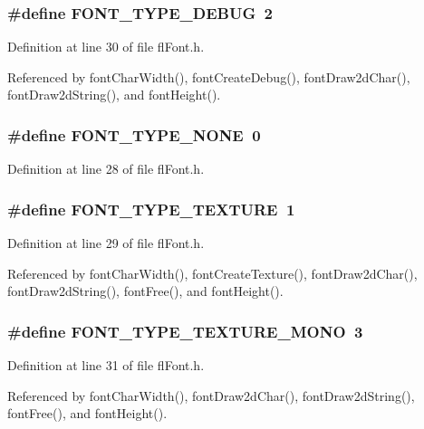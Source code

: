 \subsubsection{\setlength{\rightskip}{0pt plus 5cm}\#define FONT\_\-TYPE\_\-DEBUG~2}\label{flFont_8h_2bdce43e1cf054fb65e1cbab7be49064}




Definition at line 30 of file fl\-Font.h.

Referenced by font\-Char\-Width(), font\-Create\-Debug(), font\-Draw2d\-Char(), font\-Draw2d\-String(), and font\-Height().
\subsubsection{\setlength{\rightskip}{0pt plus 5cm}\#define FONT\_\-TYPE\_\-NONE~0}\label{flFont_8h_b52ace806e02861daff0a9f60874f318}




Definition at line 28 of file fl\-Font.h.
\subsubsection{\setlength{\rightskip}{0pt plus 5cm}\#define FONT\_\-TYPE\_\-TEXTURE~1}\label{flFont_8h_fad664fdb870e740aa0d9bc182298ea0}




Definition at line 29 of file fl\-Font.h.

Referenced by font\-Char\-Width(), font\-Create\-Texture(), font\-Draw2d\-Char(), font\-Draw2d\-String(), font\-Free(), and font\-Height().
\subsubsection{\setlength{\rightskip}{0pt plus 5cm}\#define FONT\_\-TYPE\_\-TEXTURE\_\-MONO~3}\label{flFont_8h_7dc8628be275d5fe722b01221ff470f9}




Definition at line 31 of file fl\-Font.h.

Referenced by font\-Char\-Width(), font\-Draw2d\-Char(), font\-Draw2d\-String(), font\-Free(), and font\-Height().
